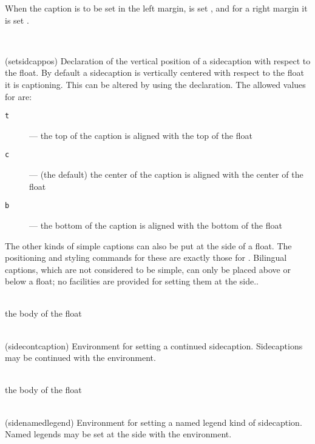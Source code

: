     When the caption is to be set in the left margin,  is
set \ptrue, and for a right margin it is set \pfalse.

\begin{syntax}
\cmd{\setsidecappos} \\
\end{syntax}
\glossary(setsidcappos)%
  {}%
  {Declaration of the vertical position of a sidecaption with respect
   to the float.}%
By default a sidecaption is vertically centered with respect to the float
it is captioning. This can be altered by using the \cmd{\setsidecappos}
declaration. The allowed values for  are:
\begin{description}
\item[\texttt{t}] --- the top of the caption is aligned 
                      with the top of the float
\item[\texttt{c}] --- (the default) the center of the caption is aligned 
                      with the center of the float
\item[\texttt{b}] --- the bottom of the caption is aligned 
                      with the bottom of the float
\end{description}

    The other kinds of simple captions can also be put at the side
of a float. The positioning and styling commands for these are exactly
those for . 
Bilingual captions, which are not considered to be simple, can only be 
placed above or below a float; 
no facilities are provided for setting them at the side..

\begin{syntax}
 \\
 the body of the float \\
 \\
\end{syntax}
\glossary(sidecontcaption)%
  {}%
  {Environment for setting a continued sidecaption.}%
Sidecaptions may be continued with the  environment.

\begin{syntax}
 \\
 the body of the float \\
 \\
\end{syntax}
\glossary(sidenamedlegend)%
  {}%
  {Environment for setting a named legend kind of sidecaption.}%
Named legends may be set at the side with the  environment.

